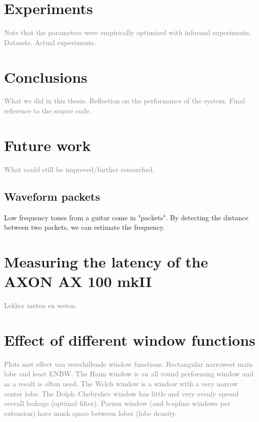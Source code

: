 \documentclass[10pt,twocolumn]{article}
\begin{document}
\section{Experiments}  \label{sec:exp}
\textcolor{gray}{Note that the parameters were empirically optimized with informal experiments. Datasets. Actual experiments.}


\section{Conclusions}
\textcolor{gray}{What we did in this thesis. Reflection on the performance of the system. Final reference to the source code.}


\section{Future work}  \label{sec:future}
\textcolor{gray}{What could still be improved/further researched.}

\subsection{Waveform packets}  \label{sub:waveform_packet}
Low frequency tones from a guitar come in "packets". By detecting the distance between two packets, we can estimate the frequency.



\appendix
\section{Measuring the latency of the AXON AX 100 mkII}  \label{sec:ax100}
\textcolor{gray}{Lekker meten en weten.}

\section{Effect of different window functions}  \label{sec:windows}
\textcolor{gray}{Plots met effect van verschillende window functions. Rectangular narrowest main lobe and least ENBW. The Hann window is an all round performing window and as a result is often used. The Welch window is a window with a very narrow center lobe. The Dolph–Chebyshev window has little and very evenly spread overall leakage (optimal filter). Parzen window (and b-spline windows per extension) have much space between lobes (lobe density. }


% 

\end{document}
